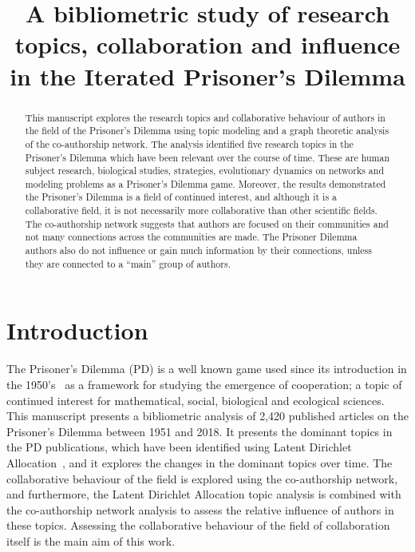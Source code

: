 \documentclass{article}
\title{A bibliometric study of research topics, collaboration and influence
in the Iterated Prisoner's Dilemma}
\theoremstyle{definition}
\begin{document}
\maketitle

\begin{abstract}
This manuscript explores the research topics and collaborative behaviour of
authors in the field of the Prisoner's Dilemma using topic modeling and a graph
theoretic analysis of the co-authorship network. The analysis identified five
research topics in the Prisoner's Dilemma which have been relevant over the course
of time. These are human subject research, biological studies, strategies,
evolutionary dynamics on networks and modeling problems as a Prisoner's Dilemma
game. Moreover, the results demonstrated the Prisoner's Dilemma is a field of
continued interest, and although it is a collaborative field, it is not
necessarily more collaborative than other scientific fields. The co-authorship
network suggests that authors are focused on their communities and not many
connections across the communities are made. The Prisoner Dilemma authors also
do not influence or gain much information by their connections, unless they are
connected to a ``main'' group of authors.
\end{abstract}

\section{Introduction}\label{section:introduction}

The Prisoner's Dilemma (PD) is a well known game used since its introduction in
the 1950's~\cite{Flood1958} as a framework for studying the emergence of
cooperation; a topic of continued interest for mathematical,
social, biological and
ecological sciences. This manuscript presents a bibliometric
analysis of 2,420 published articles on the Prisoner's Dilemma between 1951 and
2018. It presents the dominant topics in the PD publications, which have been
identified using Latent Dirichlet Allocation~\cite{Blei2003}, and it explores the changes in the
dominant topics over time. The collaborative behaviour of the field is explored
using the co-authorship network, and furthermore, the Latent Dirichlet
Allocation topic analysis is combined with the co-authorship network analysis to assess
the relative influence of authors in these topics. Assessing the collaborative
behaviour of the field of collaboration itself is the main aim of this work.
\end{document}
